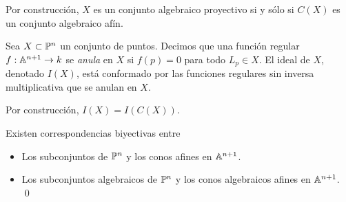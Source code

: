 \begin{remark}
Por construcción, $X$ es un conjunto algebraico proyectivo si y sólo si $C(X)$ es un conjunto algebraico afín.
\end{remark}

\begin{definition}
Sea $X \subset \P^n$ un conjunto de puntos. Decimos que una función regular $f : \A^{n+1} \to k$ se \textit{anula} en $X$ si $f(p) = 0$ para todo $L_p \in X$. El ideal de $X$, denotado $I(X)$, está conformado por las funciones regulares sin inversa multiplicativa que se anulan en $X$.
\end{definition}

\begin{remark}
Por construcción, $I(X) = I(C(X))$.
\end{remark}

\begin{corollary}
Existen correspondencias biyectivas entre

\begin{itemize}
    \item Los subconjuntos de $\P^n$ y los conos afines en $\A^{n+1}$.
    \item Los subconjuntos algebraicos de $\P^n$ y los conos algebraicos afines en $\A^{n+1}$. \qed
\end{itemize}
\end{corollary}
